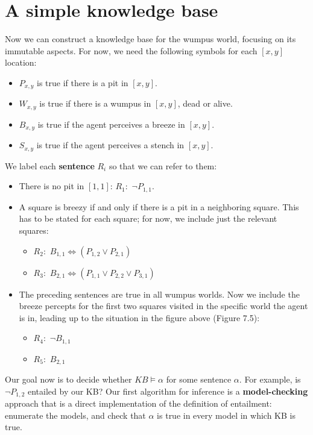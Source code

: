 \section{A simple knowledge base}
Now we can construct a knowledge base for the wumpus world, focusing on its immutable aspects. For now, we need the following symbols for each $[x, y]$ location:
\begin{itemize}
    \item $P_{x, y}$ is true if there is a pit in $[x, y]$.
    \item $W_{x,y}$ is true if there is a wumpus in $[x, y]$, dead or alive.
    \item $B_{x,y}$ is true if the agent perceives a breeze in $[x, y]$.
    \item $S_{x,y}$ is true if the agent perceives a stench in $[x, y]$.
\end{itemize}
We label each \textbf{sentence} $R_i$ so that we can refer to them:
\begin{itemize}
    \item There is no pit in $[1,1]$: $R_1:\,\, \neg P_{1,1}$.
    \item A square is breezy if and only if there is a pit in a neighboring square. This has to be stated for each square; for now, we include just the relevant squares:
    \begin{itemize}
        \item $R_2: \,\, B_{1,1} \iff (P_{1,2} \lor P_{2, 1})$
        \item $R_3: \,\, B_{2,1} \iff (P_{1,1} \lor P_{2,2} \lor P_{3,1})$
    \end{itemize}

    \item The preceding sentences are true in all wumpus worlds. Now we include the breeze percepts for the first two squares visited in the specific world the agent is in, leading up to the situation in the figure above (Figure 7.5):
    \begin{itemize}
        \item $R_4: \,\, \neg B_{1,1}$
        \item $R_5: \,\, B_{2,1}$
    \end{itemize}
\end{itemize}
Our goal now is to decide whether $KB \vDash \alpha$ for some sentence $\alpha$. For example, is $\neg P_{1,2}$ entailed by our KB? Our first algorithm for inference is a \textbf{model-checking} approach that is a direct implementation of the definition of entailment: enumerate the models, and check that $\alpha$ is true in every model in which KB is true.
